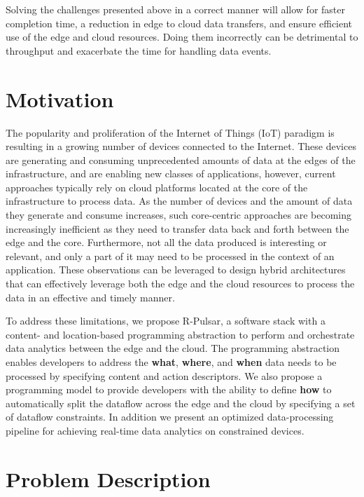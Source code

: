 Solving the challenges presented above in a correct manner will allow for faster completion time, a reduction in edge to cloud data transfers, and ensure efficient use of the edge and cloud resources. Doing them incorrectly can be detrimental to throughput and exacerbate the time for handling data events.
 
\section{Motivation}

The popularity and proliferation of the Internet of Things (IoT) paradigm is resulting in a growing number of devices connected to the Internet. These devices are generating and consuming unprecedented amounts of data at the edges of the infrastructure, and are enabling new classes of applications, however, current approaches typically rely on cloud platforms located at the core of the infrastructure to process data. As the number of devices and the amount of data they generate and consume increases, such core-centric approaches are becoming increasingly inefficient as they need to transfer data back and forth between the edge and the core. Furthermore, not all the data produced is interesting or relevant, and only a part of it may need to be processed in the context of an application. These observations can be leveraged to design hybrid architectures that can effectively leverage both the edge and the cloud resources to process the data in an effective and timely manner\cite{ahmed2017role, satyanarayanan2015edge}.

To address these limitations, we propose R-Pulsar, a software stack with a content- and location-based programming abstraction to perform and orchestrate data analytics between the edge and the cloud. The programming abstraction enables developers to address the \textbf{what}, \textbf{where}, and \textbf{when} data needs to be processed by specifying content and action descriptors. We also propose a programming model to provide developers with the ability to define \textbf{how} to automatically split the dataflow across the edge and the cloud by specifying a set of dataflow constraints. In addition we present an optimized data-processing pipeline for achieving real-time data analytics on constrained devices.

\section{Problem Description}

